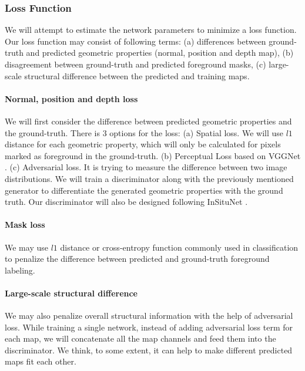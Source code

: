 \documentclass[journal]{vgtc}                %
\begin{document}
\subsubsection{Loss Function}
We will attempt to estimate the network parameters to minimize a loss function. Our loss function may consist of following terms: (a) differences between ground-truth and predicted geometric properties (normal, position and depth map),  (b) disagreement between ground-truth and predicted foreground masks, (c) large-scale structural difference between the predicted and training maps.

\paragraph{Normal, position and depth loss}
We will first consider the difference between predicted geometric properties and the ground-truth. There is 3 options for the loss: (a) Spatial loss. We will use $l1$ distance for each geometric property, which will only be calculated for pixels marked as foreground in the ground-truth. (b) Perceptual Loss based on VGGNet \cite{simonyan2014very}. (c) Adversarial loss. It is trying to measure the difference between two image distributions. We will train a discriminator along with the previously mentioned generator to differentiate the generated geometric properties with the ground truth. Our discriminator will also be designed following InSituNet \cite{he2019insitunet}. 

\paragraph{Mask loss}
We may use $l1$ distance or cross-entropy function commonly used in classification to penalize the difference between predicted and ground-truth foreground labeling.

\paragraph{Large-scale structural difference}
We may also penalize overall structural information with the help of adversarial loss. While training a single network, instead of adding adversarial loss term for each map, we will concatenate all the map channels and feed them into the discriminator. We think, to some extent, it can help to make different predicted maps fit each other.   
\end{document}
